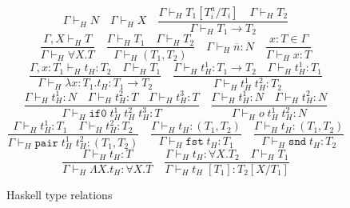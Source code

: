 \begin{figure}
\[
\Gamma\vdash_{H}N
\quad
\Gamma\vdash_{H}X
\quad
\frac{\Gamma\vdash_{H}T_{1}[T^{a}_{i}/T_{i}]\quad\Gamma\vdash_{H}T_{2}}{\Gamma\vdash_{H}T_{1}\rightarrow T_{2}}
\]
\[
\frac{\Gamma ,X\vdash_{H}T}{\Gamma\vdash_{H}\forall X.T}
\quad
\frac{\Gamma\vdash_{H}T_{1}\quad\Gamma\vdash_{H}T_{2}}{\Gamma\vdash_{H}(T_{1},T_{2})}
\quad
\Gamma\vdash_{H}\overline{n}:N
\quad
\frac{x:T\in\Gamma}{\Gamma\vdash_{H}x:T}
\]
\[
\frac{\Gamma,x:T_{1}\vdash_{H}t_{H}:T_{2}\quad\Gamma\vdash_{H}T_{1}}{\Gamma\vdash_{H}\lambda x:T_{1}.t_{H}:T_{1}\rightarrow T_{2}}
\quad
\frac{\Gamma\vdash_{H}t_{H}^{1}:T_{1}\rightarrow T_{2}\quad\Gamma\vdash_{H}t_{H}^{1}:T_{1}}{\Gamma\vdash_{H}t_{H}^{1}\;t_{H}^{2}:T_{2}}
\]
\[
\frac{\Gamma\vdash_{H}t_{H}^{1}:N\quad\Gamma\vdash_{H}t_{H}^{2}:T\quad\Gamma\vdash_{H}t_{H}^{3}:T}{\Gamma\vdash_{H}\mathtt{if0}\;t_{H}^{1}\;t_{H}^{2}\;t_{H}^{3}:T}
\quad
\frac{\Gamma\vdash_{H}t_{H}^{1}:N\quad\Gamma\vdash_{H}t_{H}^{2}:N}{\Gamma\vdash_{H}o\;t_{H}^{1}\;t_{H}^{2}:N}
\]
\[
\frac{\Gamma\vdash_{H}t_{H}^{1}:T_{1}\quad\Gamma\vdash_{H}t_{H}^{2}:T_{2}}{\Gamma\vdash_{H}\mathtt{pair}\;t_{H}^{1}\;t_{H}^{2}:(T_{1},T_{2})}
\quad
\frac{\Gamma\vdash_{H}t_{H}:(T_{1},T_{2})}{\Gamma\vdash_{H}\mathtt{fst}\;t_{H}:T_{1}}
\quad
\frac{\Gamma\vdash_{H}t_{H}:(T_{1},T_{2})}{\Gamma\vdash_{H}\mathtt{snd}\;t_{H}:T_{2}}
\]
\[
\frac{\Gamma\vdash_{H}t_{H}:T}{\Gamma\vdash_{H}\Lambda X.t_{H}:\forall X.T}
\quad
\frac{\Gamma\vdash_{H}t_{H}:\forall X.T_{2}\quad\Gamma\vdash_{H}T_{1}}{\Gamma\vdash_{H}t_{H}\;[T_{1}]:T_{2}[X/T_{1}]}
\]
\caption{Haskell type relations}
\label{htr}
\end{figure}
